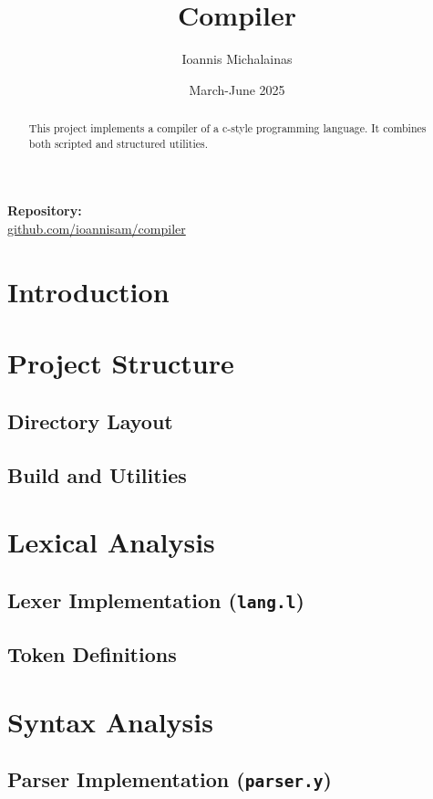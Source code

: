 \documentclass{article}
\title{Compiler}
\author{Ioannis Michalainas}
\date{March-June 2025}
\begin{document}
\maketitle
\begin{center}
  \textbf{Repository:} \\
  \href{https://github.com/ioannisam/compiler}{github.com/ioannisam/compiler}
\end{center}
\bigskip
\begin{abstract}
    This project implements a compiler of a c-style programming language. It combines both scripted and structured utilities.
\end{abstract}
\tableofcontents
\clearpage

\section{Introduction}

\section{Project Structure}
    \subsection{Directory Layout}
    \subsection{Build and Utilities}

\section{Lexical Analysis}
    \subsection{Lexer Implementation (\texttt{lang.l})}
    \subsection{Token Definitions}

\section{Syntax Analysis}
    \subsection{Parser Implementation (\texttt{parser.y})}
\end{document}
